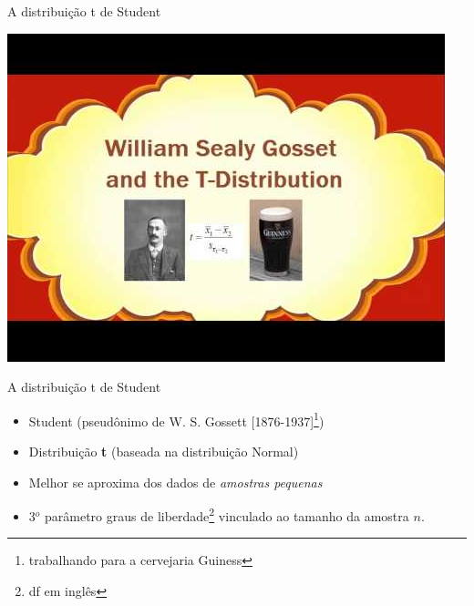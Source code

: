 \documentclass{beamer}
\begin{document}
\begin{frame}{\scriptsize A distribuição t de Student}
  \begin{center}
    \includegraphics[height=\textheight]{Cap5/Student-Guinness}
  \end{center}
\end{frame}

\begin{frame}{\scriptsize A distribuição t de Student}
  \begin{itemize}
    \footnotesize
  \item Student (pseudônimo de W. S. Gossett [1876-1937]\footnote{trabalhando
    para a cervejaria Guiness})
  \item Distribuição {\bf t} ({\footnotesize baseada na distribuição Normal})
  \item Melhor se aproxima dos dados de {\em amostras pequenas}
  \item 3$^o$ parâmetro \alert{graus de liberdade}\footnote{df em inglês} {\footnotesize vinculado ao tamanho da amostra $n$}.
  \end{itemize}
\end{frame}
\end{document}
